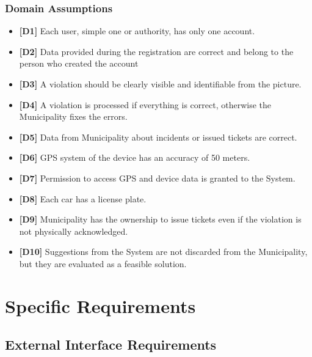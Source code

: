\documentclass {article}
\begin{document}
		\subsubsection{Domain Assumptions}
		\begin{itemize}
		 \item {\bf [D1]} Each user, simple one or authority, has only one account.
		 \item {\bf [D2]} Data provided during the registration are correct and belong to the person who created the account
		 \item {\bf [D3]} A violation should be clearly visible and identifiable from the picture.
		 \item {\bf [D4]} A violation is processed if everything is correct, otherwise the Municipality fixes the errors.
		 \item {\bf [D5]} Data from Municipality about incidents or issued tickets are correct.
		 \item {\bf [D6]} GPS system of the device has an accuracy of 50 meters.
		 \item {\bf [D7]} Permission to access GPS and device data is granted to the System.
		 \item {\bf [D8]} Each car has a license plate.
		 \item {\bf [D9]} Municipality has the ownership to issue tickets even if the violation is not physically acknowledged.
		 \item {\bf [D10]} Suggestions from the System are not discarded from the Municipality, but they are evaluated as a feasible solution.
		 \end{itemize}
		
\pagebreak

\section{Specific Requirements}
	\subsection{External Interface Requirements}	
\end{document}
